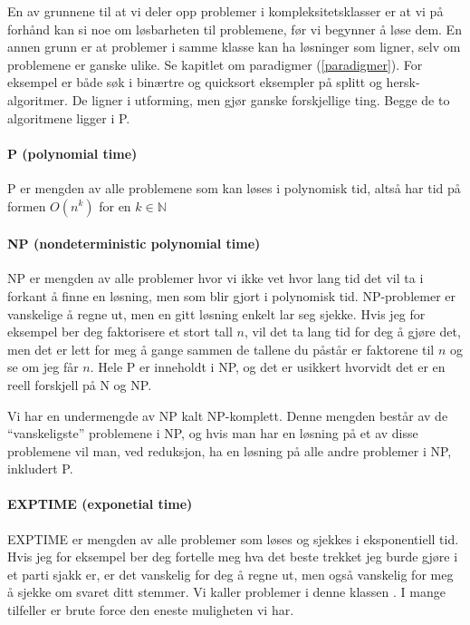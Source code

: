 En av grunnene til at vi deler opp problemer i kompleksitetsklasser er at vi på forhånd kan si noe om løsbarheten til problemene, før vi begynner å løse dem. En annen grunn er at problemer i samme klasse kan ha løsninger som ligner, selv om problemene er ganske ulike. Se kapitlet om paradigmer (\ref{paradigmer}). For eksempel er både søk i binærtre og quicksort eksempler på splitt og hersk-algoritmer. De ligner i utforming, men gjør ganske forskjellige ting. Begge de to algoritmene ligger i P. 



\paragraph{P (polynomial time)}
P er mengden av alle problemene som kan løses i polynomisk tid, altså har tid på formen $ O(n^k) $ for en $ k \in \mathbb{N} $

\paragraph{NP (nondeterministic polynomial time)}
NP er mengden av alle problemer hvor vi ikke vet hvor lang tid det vil ta i forkant å finne en løsning, men som blir gjort i polynomisk tid. NP-problemer er vanskelige å regne ut, men en gitt løsning enkelt lar seg sjekke. Hvis jeg for eksempel ber deg faktorisere et stort tall $ n $, vil det ta lang tid for deg å gjøre det, men det er lett for meg å gange sammen de tallene du påstår er faktorene til $ n $ og se om jeg får $ n $. Hele P er inneholdt i NP, og det er usikkert hvorvidt det er en reell forskjell på N og NP.

Vi har en undermengde av NP kalt NP-komplett. Denne mengden består av de ``vanskeligste'' problemene i NP, og hvis man har en løsning på et av disse problemene vil man, ved reduksjon, ha en løsning på alle andre problemer i NP, inkludert P.

\paragraph{EXPTIME (exponetial time)}
EXPTIME er mengden av alle problemer som løses og sjekkes i eksponentiell tid. Hvis jeg for eksempel ber deg fortelle meg hva det beste trekket jeg burde gjøre i et parti sjakk er, er det vanskelig for deg å regne ut, men også vanskelig for meg å sjekke om svaret ditt stemmer. Vi kaller problemer i denne klassen . I mange tilfeller er brute force den eneste muligheten vi har. 

